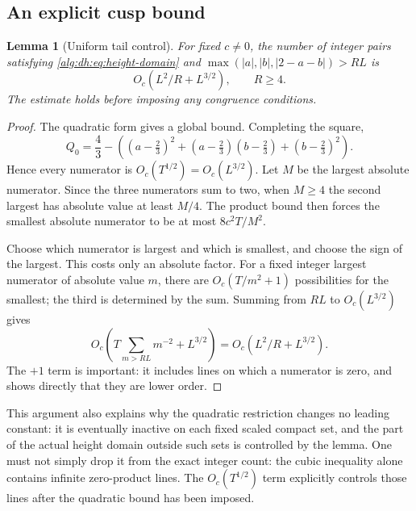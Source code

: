 \documentclass[11pt]{article}
\numberwithin{equation}{section}
\theoremstyle{plain}
\theoremstyle{plain}
\newtheorem{lemma}[lemma]{Lemma}
\theoremstyle{plain}
\theoremstyle{definition}
\theoremstyle{definition}
\theoremstyle{definition}
\theoremstyle{remark}
\begin{document}
\subsection{An explicit cusp bound}
\begin{lemma}[Uniform tail control]\label{alg:dh:lem:cusp}
For fixed $c\ne0$, the number of integer pairs satisfying
\eqref{alg:dh:eq:height-domain} and
$\max(|a|,|b|,|2-a-b|)>RL$ is
\begin{equation}\label{alg:dh:eq:cusp-tail}
 O_c(L^2/R+L^{3/2}),\qquad R\ge4.
\end{equation}
The estimate holds before imposing any congruence conditions.
\end{lemma}
\begin{proof}
The quadratic form gives a global bound. Completing the square,
\[
 Q_0=\frac43-
 \left((a-\tfrac23)^2+(a-\tfrac23)(b-\tfrac23)+(b-\tfrac23)^2\right).
\]
Hence every numerator is $O_c(T^{1/2})=O_c(L^{3/2})$.
Let $M$ be the largest absolute numerator. Since the three numerators
sum to two, when $M\ge4$ the second largest has absolute value at least
$M/4$. The product bound then forces the smallest absolute numerator to
be at most $8c^2T/M^2$.

Choose which numerator is largest and which is smallest, and choose the
sign of the largest. This costs only an absolute factor. For a fixed
integer largest numerator of absolute value $m$, there are
$O_c(T/m^2+1)$ possibilities for the smallest; the third is determined
by the sum. Summing from $RL$ to $O_c(L^{3/2})$ gives
\[
 O_c\left(T\sum_{m>RL}m^{-2}+L^{3/2}\right)
 =O_c(L^2/R+L^{3/2}).
\]
The $+1$ term is important: it includes lines on which a numerator is
zero, and shows directly that they are lower order.
\end{proof}
This argument also explains why the quadratic restriction changes no
leading constant: it is eventually inactive on each fixed scaled compact
set, and the part of the actual height domain outside such sets is
controlled by the lemma. One must not simply drop it from the exact
integer count: the cubic inequality alone contains infinite zero-product
lines. The $O_c(T^{1/2})$ term explicitly controls those lines after the
quadratic bound has been imposed.
\end{document}
